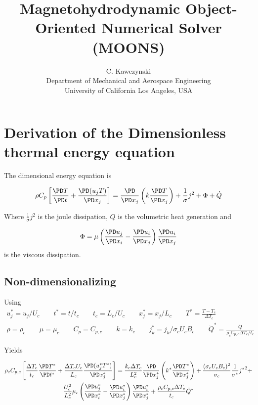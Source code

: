 \documentclass[11pt]{article}
\begin{document}
\doublespacing
\title{Magnetohydrodynamic Object-Oriented Numerical Solver (MOONS)}
\author{C. Kawczynski \\
Department of Mechanical and Aerospace Engineering \\
University of California Los Angeles, USA\\
}
\maketitle

\section{Derivation of the Dimensionless thermal energy equation}
The dimensional energy equation is

\begin{equation}
\rho C_p \left[ \frac{\PD T}{\PD t} + \frac{\PD (u_j T)}{\PD x_j} \right] =
\frac{\PD}{\PD x_j} \left( k \frac{\PD T}{\PD x_j} \right) + \frac{1}{\sigma} j^2 + \Phi + \dot{Q}
\end{equation}

Where $\frac{1}{\sigma} j^2$ is the joule dissipation, $Q$ is the volumetric heat generation and

\begin{equation}
\Phi = \mu \left( \frac{\PD u_j}{\PD x_i} - \frac{\PD u_i}{\PD x_j} \right) \frac{\PD u_i}{\PD x_j}
\end{equation}
is the viscous dissipation.

\subsection{Non-dimensionalizing}
Using
\begin{equation}\begin{aligned}
u_j^* = u_j/U_c \qquad t^* = t/t_c \qquad
t_c = L_c/U_c  \qquad x_j^* = x_j/L_c \qquad
T^* = \frac{T - T_c}{\Delta T_c} \\
\rho = \rho_c \qquad \mu = \mu_c \qquad
C_p = C_{p,c} \qquad k = k_c \qquad
j_k^* = j_k/ \sigma_c U_c B_c \qquad
\dot{Q}^* = \frac{\dot{Q}}{\rho_c C_{p,c} \Delta T_c / t_c}
\end{aligned}\end{equation}

Yields

\begin{multline}
	\rho_c C_{p,c}
	\left[
	\frac{\Delta T_c}{t_c} \frac{\PD T^*}{\PD t^*} + \frac{\Delta T_c U_c}{L_c} \frac{\PD (u_j^* T^*)}{\PD x_j^*}
	\right]
	=
	\frac{k_c \Delta T_c}{L_c^2}
	\frac{\PD}{\PD x_j^*}
	\left( k^* \frac{\PD T^*}{\PD x_j^*} \right) +
	\frac{(\sigma_c U_c B_c)^2}{\sigma_c}
	\frac{1}{\sigma^*} {j^*}^2 + \\
	\frac{U_c^2}{L_c^2}\mu_c
	\left( \frac{\PD u_j^*}{\PD x_i^*} - \frac{\PD u_i^*}{\PD x_j^*} \right)
	\frac{\PD u_i^*}{\PD x_j^*} +
	\frac{\rho_c C_{p,c} \Delta T_c}{t_c}
	\dot{Q}^*
\end{multline}
\end{document}

